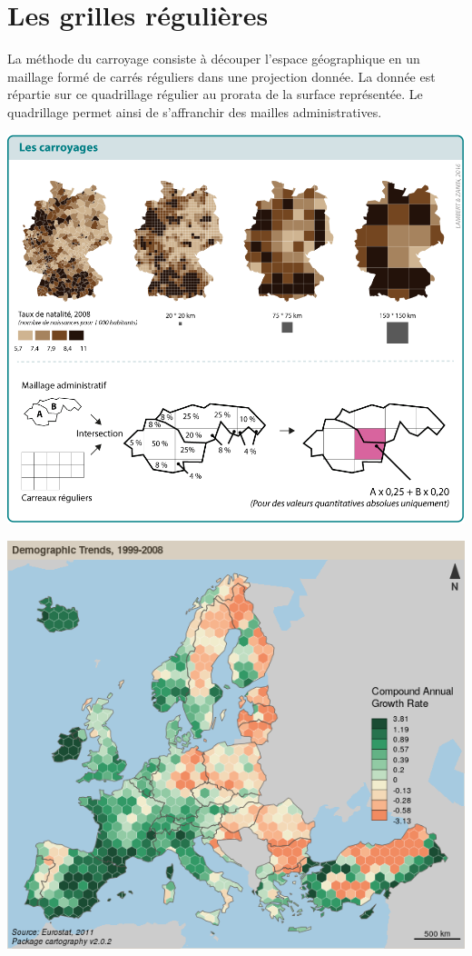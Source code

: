 \documentclass[]{book}
\begin{document}
\section{Les grilles régulières}\label{les-grilles-regulieres}

La méthode du carroyage consiste à découper l'espace géographique en un
maillage formé de carrés réguliers dans une projection donnée. La donnée
est répartie sur ce quadrillage régulier au prorata de la surface
représentée. Le quadrillage permet ainsi de s'affranchir des mailles
administratives.

\begin{center}\includegraphics[width=13.89in]{img/caromet} \end{center}

\begin{center}\includegraphics[width=8.33in]{img/grid} \end{center}
\end{document}

